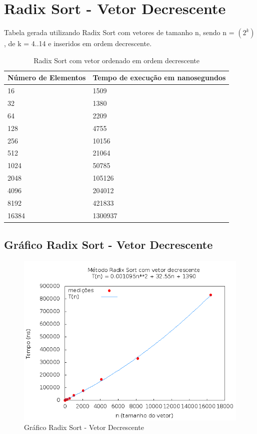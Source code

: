 \documentclass[12pt,a4paper,twoside]{report}
\begin{document}
\section{Radix Sort - Vetor Decrescente}
Tabela gerada utilizando Radix Sort com vetores de tamanho n, sendo n = $(2^k)$, de k = 4..14 e inseridos em ordem decrescente.
\begin{table}[H]
\centering
\caption{Radix Sort com vetor ordenado em ordem decrescente}
\label{my-label}
\begin{tabular}{|l|l|}
\hline
\multicolumn{1}{|c|}{\textbf{Número de Elementos}} & \multicolumn{1}{c|}{\textbf{Tempo de execução em nanosegundos}} \\ \hline
16 & 1509 \\ \hline
32 & 1380 \\ \hline
64 & 2209 \\ \hline
128 & 4755 \\ \hline
256 & 10156 \\ \hline
512 & 21064 \\ \hline
1024 & 50785 \\ \hline
2048 & 105126 \\ \hline
4096 & 204012 \\ \hline
8192 & 421833 \\ \hline
16384 & 1300937 \\ \hline
\end{tabular}
\end{table}

\subsection{Gráfico Radix Sort - Vetor Decrescente}
\begin{figure}[H]
    \centering
    \includegraphics[width=0.7\linewidth]{graficos/RadixSort/vIntDecrescente/vIntDecrescente.png}
  \caption{Gráfico Radix Sort - Vetor Decrescente}
\end{figure}
\end{document}
